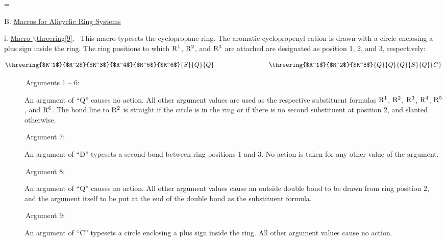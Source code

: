 
  \nofiles                          
  \def\LATEX{\LaTeX}
  \let\TEX = \TeX               
  \setcounter{totalnumber}{5}   
  \setcounter{topnumber}{3}     
  \setcounter{bottomnumber}{3}
  \setlength{\oddsidemargin}{3.9cm}     %
  \setlength{\textwidth}{5.7in}         %
  \setlength{\topmargin}{1cm}
  \setlength{\headheight}{.6cm}
  \setlength{\textheight}{8.5in}
  \setlength{\parindent}{1cm}
  \renewcommand{\baselinestretch}{1.5}
  \raggedbottom
  \setlength{\itemsep}{-2mm}
  
  
  
  
  
      
  \setcounter{page}{54}
  \setcounter{chapter}{6}
  =\tenrm
  \initial
  \newcommand{\ri}{No action is taken for any other value of 
                   the argument}

 \noindent B. \underline{Macros for Alicyclic Ring Systems}

 \vspace{\len mm}
 \indent i. \underline{Macro $\backslash $threering[9]}.
 \ This macro typesets the cyclopropane ring. The aromatic
 cyclopropenyl cation is drawn with a circle enclosing a plus
 sign inside the ring. The ring positions to which ${\rm R^1}$,
 ${\rm R^2}$, and ${\rm R^3}$ are attached are designated as
 position 1, 2, and 3, respectively:

 \[ \threering{$R^1$}{$R^2$}{$R^3$}{$R^4$}{$R^5$}{$R^6$}{S}{Q}{Q}
    \hspace{3cm}
    \threering{$R^1$}{$R^2$}{$R^3$}{Q}{Q}{Q}{S}{Q}{C}  \]

 \begin{description}
 \item[{\rm \ \ \ \ \ \ Arguments 1 -- 6:}] An argument of ``Q'' 
      causes no action. All other argument values are used as
      the respective substituent formulas ${\rm R^1}$, ${\rm R^2}$,
      ${\rm R^3}$, ${\rm R^4}$, ${\rm R^5}$, and ${\rm R^6}$.
      The bond line to ${\rm R^2}$ is straight if the circle is in
      the ring or if there is no second substituent at position 2,
      and slanted otherwise.
 \item[{\rm \ \ \ \ \ \ Argument 7:}] An argument of ``D'' typesets
      a second bond between ring positions 1 and 3. \ri .
 \item[{\rm \ \ \ \ \ \ Argument 8:}] An argument of ``Q'' causes 
      no action. All other argument values cause an outside double
      bond to be drawn from ring position 2, and the argument itself
      to be put at the end of the double bond as the substituent formula.
 \item[{\rm \ \ \ \ \ \ Argument 9:}] An argument of ``C'' typesets
      a circle enclosing a plus sign inside the ring. All other
      argument values cause no action.
 \end{description}
 
